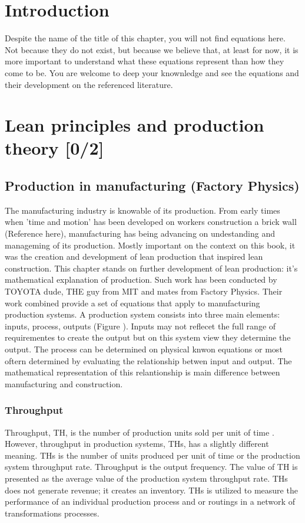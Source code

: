 \documentclass{article}
\begin{document}
\section{Introduction}
\label{sec:orgd3ab43b}
Despite the name of the title of this chapter, you will not find equations here.
Not because they do not exist, but because we believe that, at least for now, it is more important to understand what these equations represent than how they come to be.
You are welcome to deep your knownledge and see the equations and their development on the referenced literature.
\section{Lean principles and production theory [0/2]}
\label{sec:org8a57138}
\subsection{Production in manufacturing (Factory Physics)}
\label{sec:orgf75f072}
The manufacturing industry is knowable of its production.
From early times when 'time and motion' has been developed on workers construction a brick wall (Reference here), manufacturing has being advancing on undestanding and manageming of its production.
Mostly important on the context on this book, it was the creation and development of lean production that inspired lean construction.
This chapter stands on further development of lean production: it's mathematical explanation of production.
Such work has been conducted by TOYOTA dude, THE guy from MIT and mates from Factory Physics.
Their work combined provide a set of equations that apply to manufacturing production systems.
A production system consists into three main elements: inputs, process, outputs (Figure ).
Inputs may not reflecet the full range of requirementes to create the output but on this system view they determine the output.
The process can be determined on physical knwon equations or most oftern determined by evaluating the relationship betwen input and output.
The mathematical representation of this relantionship is main difference between manufacturing and construction.


\subsubsection{Throughput}
\label{sec:orgeb19b82}
Throughput, TH, is the number of production units sold per unit of time \citep{Hopp2001}.
However, throughput in production systems, THs, has a slightly different meaning.
THs is the number of units produced per unit of time or the production system throughput rate.
Throughput is the output frequency.
The value of TH is presented as the average value of the production system throughput rate.
THs does not generate revenue; it creates an inventory.
THs is utilized to measure the performance of an individual production process and or routings in a network of transformations processes.
\end{document}
